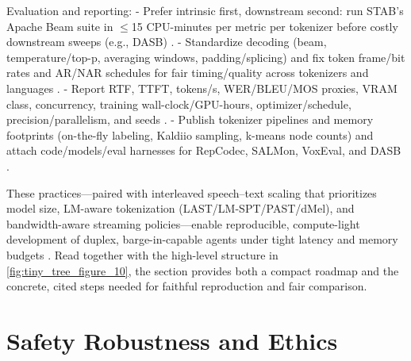 \documentclass{article}
\begin{document}
Evaluation and reporting:
- Prefer intrinsic first, downstream second: run STAB's Apache Beam suite in $\le$15 CPU-minutes per metric per tokenizer before costly downstream sweeps (e.g., DASB) \cite{vashishth2024stabspeechtokenizerassessmentbenchmark,mousavi2024dasbdiscreteaudiospeechbenchmark}.
- Standardize decoding (beam, temperature/top-p, averaging windows, padding/splicing) and fix token frame/bit rates and AR/NAR schedules for fair timing/quality across tokenizers and languages \cite{vashishth2024stabspeechtokenizerassessmentbenchmark,onda2025benchmarkingprosodyencodingdiscretespeec,entry2025indicsuperbspeechprocessinguniversalperf}.
- Report RTF, TTFT, tokens/s, WER/BLEU/MOS proxies, VRAM class, concurrency, training wall-clock/GPU-hours, optimizer/schedule, precision/parallelism, and seeds \cite{maimon2025slammingtrainingspeechlanguagemodelonegp,chen2023reducingbarriersselfsupervisedlearninghu,maimon2025scalinganalysisinterleavedspeechtextlang}.
- Publish tokenizer pipelines and memory footprints (on-the-fly labeling, Kaldiio sampling, k-means node counts) and attach code/models/eval harnesses for RepCodec, SALMon, VoxEval, and DASB \cite{chen2023reducingbarriersselfsupervisedlearninghu,huang2024repcodecspeechrepresentationcodectokeniz,maimon2025salmonsuiteacousticlanguagemodelevaluati,cui2025voxevalbenchmarkingknowledgeunderstandin,mousavi2024dasbdiscreteaudiospeechbenchmark}.

These practices---paired with interleaved speech--text scaling that prioritizes model size, LM-aware tokenization (LAST/LM-SPT/PAST/dMel), and bandwidth-aware streaming policies---enable reproducible, compute-light development of duplex, barge-in-capable agents under tight latency and memory budgets \cite{turetzky2024lastlanguagemodelawarespeechtokenization,jo2025lmsptalignedsemanticdistillationspeechto,har-tuv2025pastphoneticacousticspeechtokenizer,bai2025dmelspeechtokenizationmadesimple,maimon2025scalinganalysisinterleavedspeechtextlang}. Read together with the high-level structure in \autoref{fig:tiny_tree_figure_10}, the section provides both a compact roadmap and the concrete, cited steps needed for faithful reproduction and fair comparison.






\section{Safety Robustness and Ethics} \label{sec:Safety Robustness and Ethics}
\end{document}

